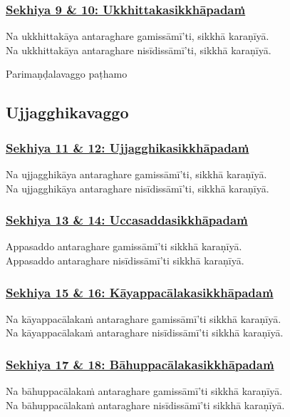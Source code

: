 \subsubsection*{\hyperref[training9-10]{Sekhiya 9 \& 10: Ukkhittakasikkhāpadaṁ}}
\label{sekh9-10}
Na ukkhittakāya antaraghare gamissāmī'ti, sikkhā karaṇīyā.\\
Na ukkhittakāya antaraghare nisīdissāmī'ti, sikkhā karaṇīyā.

\begin{center}
  Parimaṇḍalavaggo paṭhamo
\end{center}

\subsection{Ujjagghikavaggo}
\vspace{0.2cm}

\subsubsection*{\hyperref[training11-12]{Sekhiya 11 \& 12: Ujjagghikasikkhāpadaṁ}}
\label{sekh11-12}
Na ujjagghikāya antaraghare gamissāmī'ti, sikkhā karaṇīyā.\\
Na ujjagghikāya antaraghare nisīdissāmī'ti, sikkhā karaṇīyā.

\subsubsection*{\hyperref[training13-14]{Sekhiya 13 \& 14: Uccasaddasikkhāpadaṁ}}
\label{sekh13-14}
Appasaddo antaraghare gamissāmī'ti sikkhā karaṇīyā.\\
Appasaddo antaraghare nisīdissāmī'ti sikkhā karaṇīyā.

\subsubsection*{\hyperref[training15-16]{Sekhiya 15 \& 16: Kāyappacālakasikkhāpadaṁ}}
\label{sekh15-16}
Na kāyappacālakaṁ antaraghare gamissāmī'ti sikkhā karaṇīyā.\\
Na kāyappacālakaṁ antaraghare nisīdissāmī'ti sikkhā karaṇīyā.

\subsubsection*{\hyperref[training17-18]{Sekhiya 17 \& 18: Bāhuppacālakasikkhāpadaṁ}}
\label{sekh17-18}
Na bāhuppacālakaṁ antaraghare gamissāmī'ti sikkhā karaṇīyā.\\
Na bāhuppacālakaṁ antaraghare nisīdissāmī'ti sikkhā karaṇīyā.

